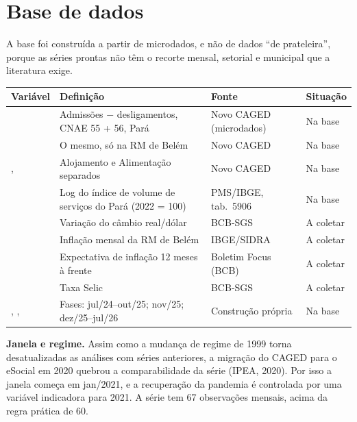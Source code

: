 
\section{Base de dados}

A base foi construída a partir de microdados, e não de dados ``de prateleira'', porque as séries
prontas não têm o recorte mensal, setorial e municipal que a literatura exige.

\begin{table}[H]
\centering\small
\begin{tabularx}{\linewidth}{p{3.3cm}Lp{2.6cm}p{1.9cm}}
\toprule
\textbf{Variável} & \textbf{Definição} & \textbf{Fonte} & \textbf{Situação}\\
\midrule
{} & Admissões $-$ desligamentos, CNAE 55 + 56, Pará & Novo CAGED (microdados) & Na base\\
 & O mesmo, só na RM de Belém & Novo CAGED & Na base\\
,  & Alojamento e Alimentação separados & Novo CAGED & Na base\\
 & Log do índice de volume de serviços do Pará (2022 = 100) & PMS/IBGE, tab.\ 5906 & Na base\\
 & Variação do câmbio real/dólar & BCB-SGS & A coletar\\
 & Inflação mensal da RM de Belém & IBGE/SIDRA & A coletar\\
 & Expectativa de inflação 12 meses à frente & Boletim Focus (BCB) & A coletar\\
 & Taxa Selic & BCB-SGS & A coletar\\
, ,  & Fases: jul/24--out/25; nov/25; dez/25--jul/26 & Construção própria & Na base\\
\bottomrule
\end{tabularx}
\end{table}

\textbf{Janela e regime.} Assim como a mudança de regime de 1999 torna desatualizadas as análises
com séries anteriores, a migração do CAGED para o eSocial em 2020 quebrou a comparabilidade da série
(IPEA, 2020). Por isso a janela começa em jan/2021, e a recuperação da pandemia é controlada por uma
variável indicadora para 2021. A série tem 67 observações mensais, acima da regra prática de 60.

